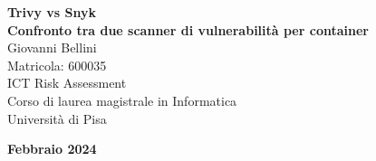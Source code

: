 \documentclass[12pt]{report}
\begin{document}
\begin{titlepage}
   \centering
   \vspace*{5cm} %

   {\Huge\bfseries Trivy vs Snyk}\\[1cm] %
   {\Large\bfseries Confronto tra due scanner di vulnerabilità per container}\\[2cm] %

   \vspace*{\fill} %
   {\large Giovanni Bellini}\\[0.5cm] %
   {\large Matricola: 600035}\\[1cm] %

   {\normalsize ICT Risk Assessment}\\
   {\normalsize Corso di laurea magistrale in Informatica}\\
   {\normalsize Università di Pisa}\\[2cm] %

   \vspace{1.5cm}

   {\Large\bfseries Febbraio 2024} %

   \vspace*{2cm}


\end{titlepage}
\pagebreak

\tableofcontents




\printbibliography
\end{document}

